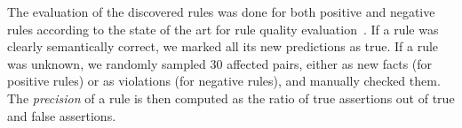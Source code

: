The evaluation of the discovered rules 
was done for both positive and negative rules according to the state of the art for rule quality evaluation~\cite{galarraga2015fast}. If a rule was clearly semantically correct, we marked all its new predictions as true. If a rule was unknown, we randomly sampled 30 affected pairs, either as new facts (for positive rules) or as violations (for negative rules), 
and manually checked them. %
The \emph{precision} of a rule is then computed as the ratio of true assertions out of true and false assertions. 
